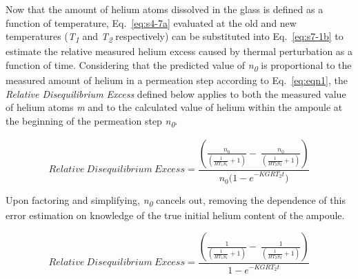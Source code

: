 Now that the amount of helium atoms dissolved in the glass is defined as
a function of temperature, Eq.~\eqref{eq:s4-7a} evaluated at the old and new
temperatures (\emph{T\textsubscript{1}} and \emph{T\textsubscript{2}}
respectively) can be substituted into Eq.~\eqref{eq:s7-1b} to estimate the
relative measured helium excess caused by thermal perturbation as a
function of time. Considering that the predicted value of
\emph{n\textsubscript{0}} is proportional to the measured amount of
helium in a permeation step according to Eq.~\eqref{eq:eqn1}, the \emph{Relative
Disequilibrium Excess} defined below applies to both the measured value
of helium atoms \emph{m} and to the calculated value of helium within
the ampoule at the beginning of the permeation step
\emph{n\textsubscript{0}}.

\[
Relative\ Disequilibrium\ Excess = \frac{\left( \frac{n_{0}}{\left( \frac{1}{HT_{1}S_{1}} + 1 \right)} - \ \frac{n_{0}}{\left( \frac{1}{HT_{2}S_{2}} + 1 \right)} \right)}{n_{0}{(1 - e}^{- KGRT_{2}t})}
\]

Upon factoring and simplifying, \emph{n\textsubscript{0}} cancels out,
removing the dependence of this error estimation on knowledge of the
true initial helium content of the ampoule.

\begin{equation}
Relative\ Disequilibrium\ Excess = \frac{\left( \frac{1}{\left( \frac{1}{HT_{1}S_{1}} + 1 \right)} - \ \frac{1}{\left( \frac{1}{HT_{2}S_{2}} + 1 \right)} \right)}{{1 - e}^{- KGRT_{2}t}}
\label{eq:s7-2}
\end{equation}

